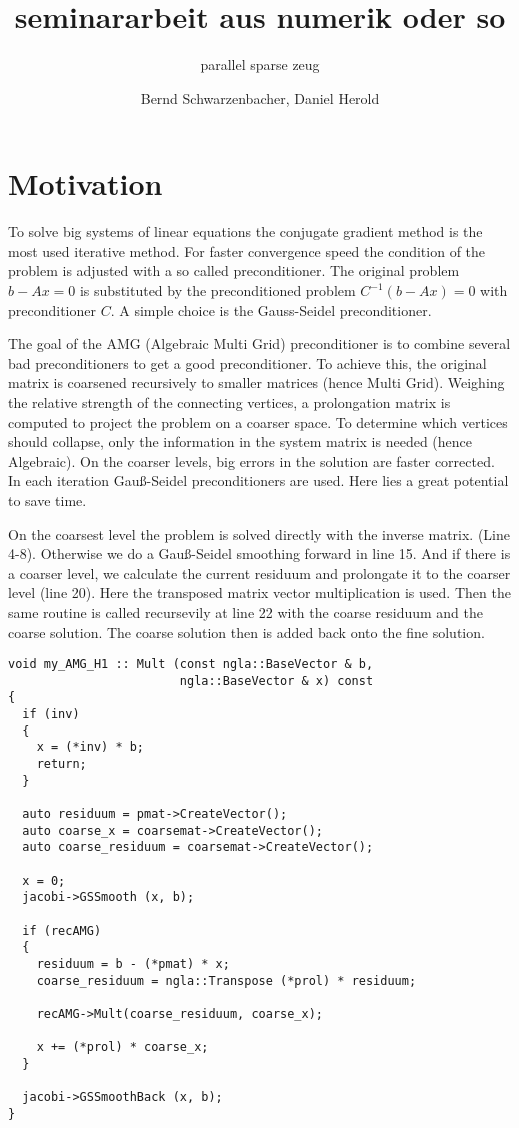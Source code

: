 \documentclass[a4paper,11pt]{scrartcl}
\title{seminararbeit aus numerik oder so}
\subtitle{parallel sparse zeug}
\author{Bernd Schwarzenbacher, Daniel Herold}
\begin{document}
\maketitle
\tableofcontents

\pagebreak

\section{Motivation}

To solve big systems of linear equations the conjugate gradient method is the
most used iterative method.
For faster convergence speed the condition of the problem is
adjusted with a so called preconditioner.
The original problem $b-Ax=0$ is substituted by the preconditioned problem
$C^{-1} (b-Ax) = 0$ with preconditioner $C$.
A simple choice is the Gauss-Seidel preconditioner.

The goal of the AMG (Algebraic Multi Grid) preconditioner is to combine several
bad preconditioners to get a good preconditioner. To achieve this, the original
matrix is coarsened recursively to smaller matrices (hence Multi Grid).
Weighing the relative strength of the connecting vertices, a prolongation matrix
is computed to project the problem on a coarser space. To determine which
vertices should collapse, only the information in the system matrix is needed
(hence Algebraic).
On the coarser levels, big errors in the solution are faster corrected.
In each iteration Gauß-Seidel preconditioners are used.
Here lies a great potential to save time.

On the coarsest level the problem is solved directly with the inverse matrix.
(Line 4-8).
Otherwise we do a Gauß-Seidel smoothing forward in line 15.
And if there is a coarser level, we calculate the current residuum and
prolongate it to the coarser level (line 20). Here the transposed
matrix vector multiplication is used. Then the same routine is called
recursevily at line 22 with the coarse residuum and the coarse solution. The
coarse solution then is added back onto the fine solution.

\begin{lstlisting}
void my_AMG_H1 :: Mult (const ngla::BaseVector & b,
                        ngla::BaseVector & x) const
{
  if (inv)
  {
    x = (*inv) * b;
    return;
  }

  auto residuum = pmat->CreateVector();
  auto coarse_x = coarsemat->CreateVector();
  auto coarse_residuum = coarsemat->CreateVector();

  x = 0;
  jacobi->GSSmooth (x, b);

  if (recAMG)
  {
    residuum = b - (*pmat) * x;
    coarse_residuum = ngla::Transpose (*prol) * residuum;

    recAMG->Mult(coarse_residuum, coarse_x);

    x += (*prol) * coarse_x;
  }

  jacobi->GSSmoothBack (x, b);
}
\end{lstlisting}
\end{document}
